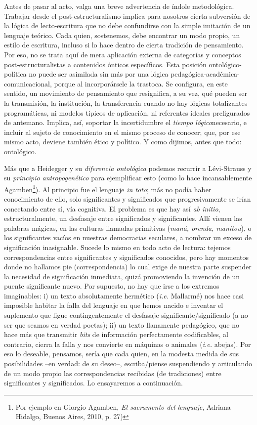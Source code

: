 Antes de pasar al acto, valga una breve advertencia de índole
metodológica. Trabajar desde el post-estructuralismo implica para
nosotros cierta subversión de la lógica de lecto-escritura que no debe
confundirse con la simple imitación de un lenguaje teórico. Cada quien,
sostenemos, debe encontrar un modo propio, un estilo de escritura,
incluso si lo hace dentro de cierta tradición de pensamiento. Por eso,
no se trata aquí de mera aplicación externa de categorías y conceptos
post-estructuralistas a contenidos ónticos específicos. Esta posición
ontológico-política no puede ser asimilada sin más por una lógica
pedagógica-académica-comunicacional, porque al incorporársele la
trastoca. Se configura, en este sentido, un movimiento de pensamiento
que resignifica, a su vez, qué pueden ser la transmisión, la
institución, la transferencia cuando no hay lógicas totalizantes
programáticas, ni modelos típicos de aplicación, ni referentes ideales
prefigurados de antemano. Implica, así, soportar la incertidumbre el
\emph{tiempo lógico}necesario, e incluir al sujeto de conocimiento en el
mismo proceso de conocer; que, por ese mismo acto, deviene también ético
y político. Y como dijimos, antes que todo: ontológico.

Más que a Heidegger y su \emph{diferencia ontológica} podemos recurrir a
Lévi-Strauss y su \emph{principio antropogenético} para ejemplificar
esto (como lo hace incansablemente Agamben\footnote{Por ejemplo en
  Giorgio Agamben, \emph{El sacramento del lenguaje}, Adriana Hidalgo,
  Buenos Aires, 2010, p. 27)}). Al principio fue el lenguaje \emph{in
toto}; más no podía haber conocimiento de ello, solo significantes y
significados que progresivamente se irían conectando entre sí, vía
cognitiva. El problema es que hay así \emph{ab initio},
estructuralmente, un desfasaje entre significados y significantes. Allí
vienen las palabras mágicas, en las culturas llamadas primitivas
(\emph{maná, orenda, manitou}), o los significantes vacíos en nuestras
democracias seculares, a nombrar un exceso de significación inasignable.
Sucede lo mismo en todo acto de lectura: tejemos correspondencias entre
significantes y significados conocidos, pero hay momentos donde no
hallamos pie (correspondencia) lo cual exige de nuestra parte suspender
la necesidad de significación inmediata, quizá promoviendo la invención
de un puente significante nuevo. Por supuesto, no hay que irse a los
extremos imaginables: i) un texto absolutamente hermético (\emph{i.e.}
Mallarmé) nos hace casi imposible habitar la falla del lenguaje en que
hemos nacido e inventar el suplemento que ligue contingentemente el
desfasaje significante/significado (a no ser que seamos en verdad
poetas); ii) un texto llanamente pedagógico, que no hace más que
transmitir \emph{bits} de información perfectamente codificables, al
contrario, cierra la falla y nos convierte en máquinas o animales
(\emph{i.e.} abejas). Por eso lo deseable, pensamos, sería que cada
quien, en la modesta medida de sus posibilidades --en verdad: de su
deseo--, escriba/piense suspendiendo y articulando de un modo propio las
correspondencias recibidas (de tradiciones) entre significantes y
significados. Lo ensayaremos a continuación.

